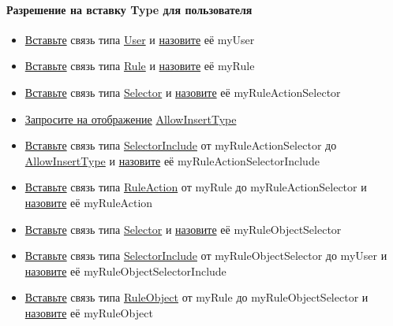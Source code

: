 \paragraph{Разрешение на вставку Type для пользователя}
\begin{itemize}
  \item \hyperlink{DeepCase.InsertLink.Description}{Вставьте} связь типа
  \hyperlink{Core.User.Description}{User} и
  \hyperlink{FAQ.HowToSetName}{назовите} её myUser
  \item \hyperlink{DeepCase.InsertLink.Description}{Вставьте} связь типа
  \hyperlink{Core.Rule.Description}{Rule} и
  \hyperlink{FAQ.HowToSetName}{назовите} её myRule

  \item \hyperlink{DeepCase.InsertLink.Description}{Вставьте} связь типа
  \hyperlink{Core.Selector.Description}{Selector} и
  \hyperlink{FAQ.HowToSetName}{назовите} её myRuleActionSelector
  \item \hyperlink{Core.Query.Description}{Запросите на отображение} \hyperlink{Core.AllowInsertType.Description}{AllowInsertType}
  \item \hyperlink{DeepCase.InsertLink.Description}{Вставьте} связь типа \hyperlink{Core.SelectorInclude.Description}{SelectorInclude} от myRuleActionSelector до \hyperlink{Core.AllowInsertType.Description}{AllowInsertType} и
  \hyperlink{FAQ.HowToSetName}{назовите} её myRuleActionSelectorInclude
  \item \hyperlink{DeepCase.InsertLink.Description}{Вставьте} связь типа
  \hyperlink{Core.RuleAction.Description}{RuleAction} от myRule до myRuleActionSelector и
  \hyperlink{FAQ.HowToSetName}{назовите} её myRuleAction

  \item \hyperlink{DeepCase.InsertLink.Description}{Вставьте} связь типа
  \hyperlink{Core.Selector.Description}{Selector} и
  \hyperlink{FAQ.HowToSetName}{назовите} её myRuleObjectSelector
  \item \hyperlink{DeepCase.InsertLink.Description}{Вставьте} связь типа \hyperlink{Core.SelectorInclude.Description}{SelectorInclude} от myRuleObjectSelector до myUser и
  \hyperlink{FAQ.HowToSetName}{назовите} её myRuleObjectSelectorInclude
  \item \hyperlink{DeepCase.InsertLink.Description}{Вставьте} связь типа
  \hyperlink{Core.RuleObject.Description}{RuleObject} от myRule до myRuleObjectSelector и
  \hyperlink{FAQ.HowToSetName}{назовите} её myRuleObject


\end{itemize}
